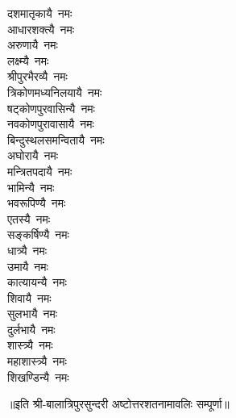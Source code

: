 \begin{flushleft}
\begin{multicols}{2}
दशमातृकायै~नमः\\
आधारशक्त्यै~नमः\\
अरुणायै~नमः\\
लक्ष्म्यै~नमः\\
श्रीपुरभैरव्यै~नमः\\
त्रिकोणमध्यनिलयायै~नमः\hfill{}\\
षट्कोणपुरवासिन्यै~नमः\\
नवकोणपुरावासायै~नमः\\
बिन्दुस्थलसमन्वितायै~नमः\\
अघोरायै~नमः\\
मन्त्रितपदायै~नमः\\
भामिन्यै~नमः\\
भवरूपिण्यै~नमः\\
एतस्यै~नमः\\
सङ्कर्षिण्यै~नमः\\
धात्र्यै~नमः\hfill{}\\
उमायै~नमः\\
कात्यायन्यै~नमः\\
शिवायै~नमः\\
सुलभायै~नमः\\
दुर्लभायै~नमः\\
शास्त्र्यै~नमः\\
महाशास्त्र्यै~नमः\\
शिखण्डिन्यै~नमः\\
\end{multicols}
\end{flushleft}
॥इति श्री-बालात्रिपुरसुन्दरी अष्टोत्तरशतनामावलिः सम्पूर्णा॥
